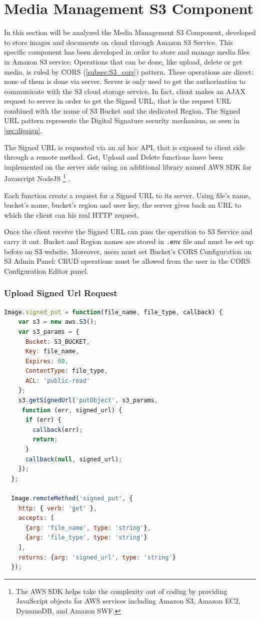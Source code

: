 \section{Media Management S3 Component}
\label{sec:S3_component}

In this section will be analyzed the Media Management S3 Component, developed to store images and documents on cloud through Amazon S3 Service.
This specific component has been developed in order to store and manage media files in Amazon S3 service.
Operations that can be done, like upload, delete or get media, is ruled by CORS (\ref{subsec:S3_cors}) pattern.
These operations are direct: none of them is done via server. Server is only used to get the authorization to communicate with the S3 cloud storage service.
In fact, client makes an AJAX request to server in order to get the Signed URL, that is the request URL combined with the name of S3 Bucket and the dedicated Region.
The Signed URL pattern represents the Digital Signature security mechanism, as seen in \ref{sec:digsign}.

The Signed URL is requested via an ad hoc API, that is exposed to client side through a remote method.
Get, Upload and Delete functions have been implemented on the server side using an additional library named AWS SDK for Javascript NodeJS \footnote{ The AWS SDK helps take the complexity out of coding by providing JavaScript objects for AWS services including Amazon S3, Amazon EC2, DynamoDB, and Amazon SWF.} \cite{s3_aws_sdk}.

Each function create a request for a Signed URL to its server.
Using file's name, bucket's name, bucket's region and user key, the server gives back an URL to which the client can his real HTTP request.

Once the client receive the Signed URL can pass the operation to S3 Service and carry it out.
Bucket and Region names are stored in \texttt{.env} file and must be set up before on S3 website.
Moreover, users must set Bucket's CORS Configuration on S3 Admin Panel: CRUD operations must be allowed from the user in the CORS Configuration Editor panel.


\subsubsection{Upload Signed Url Request}

\begin{lstlisting}[language=javascript]
Image.signed_put = function(file_name, file_type, callback) {
    var s3 = new aws.S3();
    var s3_params = {
      Bucket: S3_BUCKET,
      Key: file_name,
      Expires: 60,
      ContentType: file_type,
      ACL: 'public-read'
    };
    s3.getSignedUrl('putObject', s3_params,
     function (err, signed_url) {
      if (err) {
        callback(err);
        return;
      }
      callback(null, signed_url);
    });
  };

  Image.remoteMethod('signed_put', {
    http: { verb: 'get' },
    accepts: [
      {arg: 'file_name', type: 'string'},
      {arg: 'file_type', type: 'string'}
    ],
    returns: {arg: 'signed_url', type: 'string'}
  });
\end{lstlisting}

